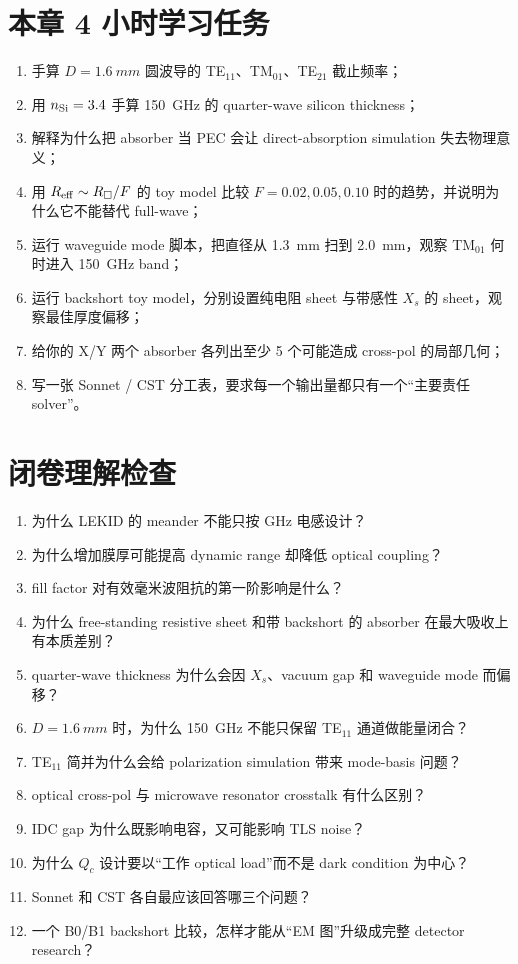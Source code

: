 \documentclass[11pt,a4paper,openany]{ctexrep}
\begin{document}
\section{本章 4 小时学习任务}

\begin{enumerate}
  \item 手算 $D=\SI{1.6}{mm}$ 圆波导的 TE$_{11}$、TM$_{01}$、TE$_{21}$ 截止频率；
  \item 用 $n_{\rm Si}=3.4$ 手算 \SI{150}{GHz} 的 quarter-wave silicon thickness；
  \item 解释为什么把 absorber 当 PEC 会让 direct-absorption simulation 失去物理意义；
  \item 用 $R_{\rm eff}\sim R_\square/F$ 的 toy model 比较 $F=0.02,0.05,0.10$ 时的趋势，并说明为什么它不能替代 full-wave；
  \item 运行 waveguide mode 脚本，把直径从 \SI{1.3}{mm} 扫到 \SI{2.0}{mm}，观察 TM$_{01}$ 何时进入 \SI{150}{GHz} band；
  \item 运行 backshort toy model，分别设置纯电阻 sheet 与带感性 $X_s$ 的 sheet，观察最佳厚度偏移；
  \item 给你的 X/Y 两个 absorber 各列出至少 5 个可能造成 cross-pol 的局部几何；
  \item 写一张 Sonnet / CST 分工表，要求每一个输出量都只有一个“主要责任 solver”。
\end{enumerate}

\section{闭卷理解检查}

\begin{checkpointbox}
\begin{enumerate}
  \item 为什么 LEKID 的 meander 不能只按 GHz 电感设计？
  \item 为什么增加膜厚可能提高 dynamic range 却降低 optical coupling？
  \item fill factor 对有效毫米波阻抗的第一阶影响是什么？
  \item 为什么 free-standing resistive sheet 和带 backshort 的 absorber 在最大吸收上有本质差别？
  \item quarter-wave thickness 为什么会因 $X_s$、vacuum gap 和 waveguide mode 而偏移？
  \item $D=\SI{1.6}{mm}$ 时，为什么 \SI{150}{GHz} 不能只保留 TE$_{11}$ 通道做能量闭合？
  \item TE$_{11}$ 简并为什么会给 polarization simulation 带来 mode-basis 问题？
  \item optical cross-pol 与 microwave resonator crosstalk 有什么区别？
  \item IDC gap 为什么既影响电容，又可能影响 TLS noise？
  \item 为什么 $Q_c$ 设计要以“工作 optical load”而不是 dark condition 为中心？
  \item Sonnet 和 CST 各自最应该回答哪三个问题？
  \item 一个 B0/B1 backshort 比较，怎样才能从“EM 图”升级成完整 detector research？
\end{enumerate}
\end{checkpointbox}
\end{document}
